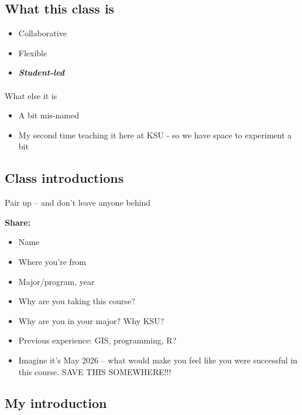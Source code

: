 \documentclass[
  letterpaper,
  DIV=11,
  numbers=noendperiod]{scrartcl}
\makeatletter
\let\oldparagraph\paragraph
\renewcommand{\paragraph}{
    \@ifstar
      \xxxParagraphStar
      \xxxParagraphNoStar
  }
\newcommand{\xxxParagraphStar}[1]{\oldparagraph*{#1}\mbox{}}
\newcommand{\xxxParagraphNoStar}[1]{\oldparagraph{#1}\mbox{}}
\providecommand{\tightlist}{%
  \setlength{\itemsep}{0pt}\setlength{\parskip}{0pt}}
\makeatother
\begin{document}
\subsection{What this class is}\label{what-this-class-is}

\begin{itemize}
\tightlist
\item
  Collaborative
\item
  Flexible
\item
  \textbf{\emph{Student-led}}
\end{itemize}

\paragraph{What else it is}\label{what-else-it-is}

\begin{itemize}
\tightlist
\item
  A bit mis-named
\item
  My second time teaching it here at KSU - so we have space to
  experiment a bit
\end{itemize}

\subsection{Class introductions}\label{class-introductions}

Pair up -- and don't leave anyone behind

\textbf{Share:}

\begin{itemize}
\item
  Name
\item
  Where you're from
\item
  Major/program, year
\item
  Why are you taking this course?
\item
  Why are you in your major? Why KSU?
\item
  Previous experience: GIS, programming, R?
\item
  Imagine it's May 2026 -- what would make you feel like you were
  successful in this course. SAVE THIS SOMEWHERE!!!
\end{itemize}

\subsection{My introduction}\label{my-introduction}
\end{document}
